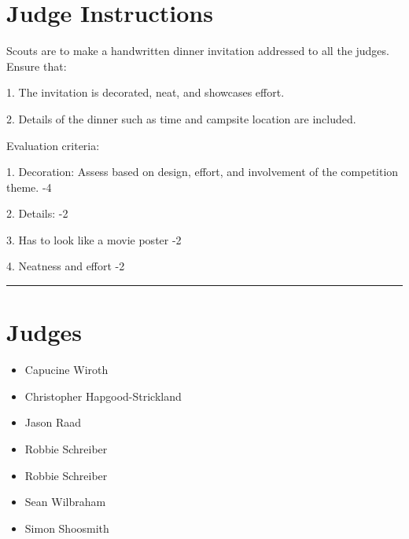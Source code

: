 \documentclass[10pt]{article}
\begin{document}
		\section*{Judge Instructions}
		Scouts are to make a handwritten dinner invitation addressed to all the judges. Ensure that:

1. The invitation is decorated, neat, and showcases effort.

2. Details of the dinner such as time and campsite location are included.





Evaluation criteria:

1. Decoration: Assess based on design, effort, and involvement of the competition theme. -4

2. Details: -2 

3. Has to look like a movie poster -2

4. Neatness and effort -2


\vspace{0.5cm}
	\hrule
	\vspace{0.5cm}
		\section*{\faUsers \: Judges}

		

	\begin{multicols}{2}

		\begin{itemize}
									\item Capucine Wiroth
									\item Christopher Hapgood-Strickland
									\item Jason Raad
									\item Robbie Schreiber
						\end{itemize}

		\vfill\null
		\columnbreak

		\begin{itemize}
									\item Robbie Schreiber
									\item Sean Wilbraham
									\item Simon Shoosmith
						\end{itemize}

		\vfill\null

		\end{multicols}
\end{document}
